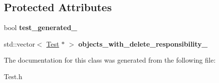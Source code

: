 \subsection*{Protected Attributes}
\begin{DoxyCompactItemize}
\item 
\mbox{\label{class_test_aa0c74215e7ebe83f150fd976df2a2f0c}} 
bool {\bfseries test\+\_\+generated\+\_\+}
\item 
\mbox{\label{class_test_a6d134f96b13a6d97991731bfeb60d086}} 
std\+::vector$<$ \hyperlink{class_test}{Test} $\ast$ $>$ {\bfseries objects\+\_\+with\+\_\+delete\+\_\+responsibility\+\_\+}
\end{DoxyCompactItemize}


The documentation for this class was generated from the following file\+:\begin{DoxyCompactItemize}
\item 
Test.\+h\end{DoxyCompactItemize}
